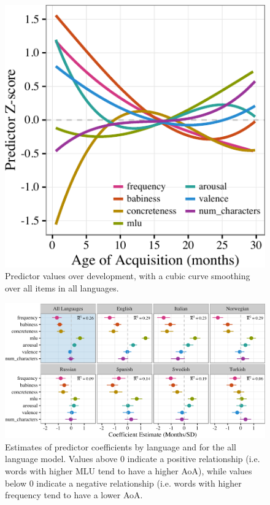 \documentclass[10pt, letterpaper]{article}
\newenvironment{CodeChunk}{}{}
\begin{document}
\begin{CodeChunk}
\begin{figure}[!hb]

{\centering \includegraphics{figs/devo-1} 

}

\caption[Predictor values over development, with a cubic curve smoothing over all items in all languages]{Predictor values over development, with a cubic curve smoothing over all items in all languages.}\label{fig:devo}
\end{figure}
\end{CodeChunk}

\begin{CodeChunk}
\begin{figure}[tb]

{\centering \includegraphics{figs/coefs-1} 

}

\caption[Estimates of predictor coefficients by language and for the all language model]{Estimates of predictor coefficients by language and for the all language model. Values above 0 indicate a positive relationship (i.e. words with higher MLU tend to have a higher AoA), while values below 0 indicate a negative relationship (i.e. words with higher frequency tend to have a lower AoA.}\label{fig:coefs}
\end{figure}
\end{CodeChunk}
\end{document}
